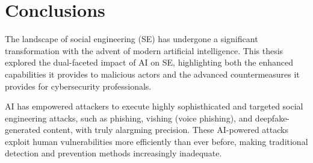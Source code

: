 



\chapter{Conclusions\label{chapter:conclusions}}
\begin{comment}
    
Guides:
    - As many pages as it takes (thesis max is around 20 pages)

TODO:
    [ ] How AI has augmented SE attacks and countermeasures
    [ ] Gap in the literature

What to cover:
    - How AI has augmented SE attacks and countermeasures
    - Gap in the literature regarding SE and AI intersection?
    - Analysis on where AI-powered SE attacks might be headed in the future
        - Also about robotics and human-like actors
    - What organizations and individuals need to do regarding the evolving landscape of SE attacks

Speculation:
    - Drones dropping USB thumbdrives?
    - Human-like android as threat actors
    - Impact of robotics on dumpster diving, shoulder surfing and baiting
    
Literature:
    - Gen and detection of deepfakes

From training material:
    - Yhteenveto vaatimattomimmillaan on vain lyhyt kertaus kirjoituksen keskeisistä asioista. Arvokkaamman yhteenvedon saa aikaan kommentoimalla työn tulosten arvoa, työn liittymistä ympäristöön ja tulevaisuudennäkymiä. Tällaiset arviot huolellisesti perusteltava.

\end{comment}

The landscape of social engineering (SE) has undergone a significant transformation with the advent of modern artificial intelligence. This thesis explored the dual-faceted impact of AI on SE, highlighting both the enhanced capabilities it provides to malicious actors and the advanced countermeasures it provides for cybersecurity professionals.

AI has empowered attackers to execute highly sophisthicated and targeted social engineering attacks, such as phishing, vishing (voice phishing), and deepfake-generated content, with truly alargming precision. These AI-powered attacks exploit human vulnerabilities more efficiently than ever before, making traditional detection and prevention methods increasingly inadequate.


